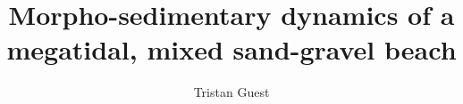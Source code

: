 \documentclass[12pt,timestamp]{ocethesis}
\begin{document}
\phd
\title{Morpho-sedimentary dynamics of a megatidal, mixed sand-gravel beach}
\author{Tristan Guest}



\frontmatter









\mainmatter


















\appendix

\label{Appendix1}

\label{Appendix2}




%

%
\end{document}
